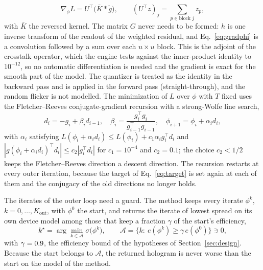 \begin{equation}
\nabla_\phi L=U^{\top}\!\big(\bar K*\tilde g\big),\qquad (U^{\top}z)_j=\sum_{p\in\text{block }j}z_p,\label{eq:gradphi}
\end{equation}
with $\bar K$ the reversed kernel. The matrix $G$ never needs to be formed: $h$ is one inverse transform of the readout of the weighted residual, and Eq.~\ref{eq:gradphi} is a convolution followed by a sum over each $u\times u$ block. This is the adjoint of the crosstalk operator, which the engine tests against the inner-product identity to $10^{-12}$, so no automatic differentiation is needed and the gradient is exact for the smooth part of the model. The quantizer is treated as the identity in the backward pass and is applied in the forward pass (straight-through), and the random flicker is not modelled. The minimization of $L$ over $\phi$ with $T$ fixed uses the Fletcher--Reeves conjugate-gradient recursion with a strong-Wolfe line search,
\begin{equation}
d_i=-g_i+\beta_id_{i-1},\quad \beta_i=\frac{g_i^{\top}g_i}{g_{i-1}^{\top}g_{i-1}},\quad \phi_{i+1}=\phi_i+\alpha_id_i,\label{eq:cg}
\end{equation}
with $\alpha_i$ satisfying $L(\phi_i+\alpha_id_i)\le L(\phi_i)+c_1\alpha_ig_i^{\top}d_i$ and $|g(\phi_i+\alpha_id_i)^{\top}d_i|\le c_2|g_i^{\top}d_i|$ for $c_1=10^{-4}$ and $c_2=0.1$; the choice $c_2<1/2$ keeps the Fletcher--Reeves direction a descent direction.
The recursion restarts at every outer iteration, because the target of Eq.~\ref{eq:target} is set again at each of them and the conjugacy of the old directions no longer holds.

The iterates of the outer loop need a guard. The method keeps every iterate $\phi^k$, $k=0,\dots,K_{\mathrm{out}}$, with $\phi^0$ the start, and returns the iterate of lowest spread on its own device model among those that keep a fraction $\gamma$ of the start's efficiency,
\begin{equation}
k^\star=\arg\min_{k\in\mathcal A}\sigma\big(\phi^k\big),\qquad \mathcal A=\{k:\ e(\phi^k)\ge\gamma\,e(\phi^0)\}\ni0,\label{eq:safeguard}
\end{equation}
with $\gamma=0.9$, the efficiency bound of the hypotheses of Section~\ref{sec:design}. Because the start belongs to $\mathcal A$, the returned hologram is never worse than the start on the model of the method.


